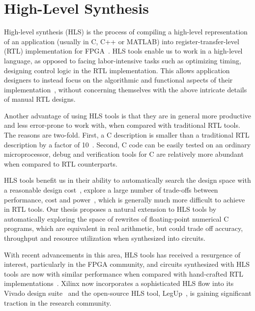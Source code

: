 \section{High-Level Synthesis}
\label{bg:sec:high_level_synthesis}

High-level synthesis (HLS) is the process of compiling a high-level
representation of an application (usually in C, C++ or MATLAB) into
register-transfer-level (RTL) implementation for FPGA~\cite{coussy, gajski}.
HLS tools enable us to work in a high-level language, as opposed to facing
labor-intensive tasks such as optimizing timing, designing control logic in
the RTL implementation. This allows application designers to instead focus on
the algorithmic and functional aspects of their implementation~\cite{coussy},
without concerning themselves with the above intricate details of manual RTL
designs.

Another advantage of using HLS tools is that they are in general more
productive and less error-prone to work with, when compared with traditional
RTL tools.  The reasons are two-fold.  First, a C description is smaller than a
traditional RTL description by a factor of 10~\cite{coussy, bdti}.  Second, C
code can be easily tested on an ordinary microprocessor, debug and verification
tools for C are relatively more abundant when compared to RTL counterparts.

HLS tools benefit us in their ability to automatically search the design
space with a reasonable design cost~\cite{bdti}, explore a large number of
trade-offs between performance, cost and power~\cite{mcfarland}, which is
generally much more difficult to achieve in RTL tools.  Our thesis proposes
a natural extension to HLS tools by automatically exploring the space of
rewrites of floating-point numerical C programs, which are equivalent in real
arithmetic, but could trade off accuracy, throughput and resource utilization
when synthesized into circuits.

With recent advancements in this area, HLS tools has received a resurgence of
interest, particularly in the FPGA community, and circuits synthesized with
HLS tools are now with similar performance when compared with hand-crafted RTL
implementations~\cite{bdti}.  Xilinx now incorporates a sophisticated HLS flow
into its Vivado design suite~\cite{vivado_hls} and the open-source HLS tool,
LegUp~\cite{legup}, is gaining significant traction in the research community.

